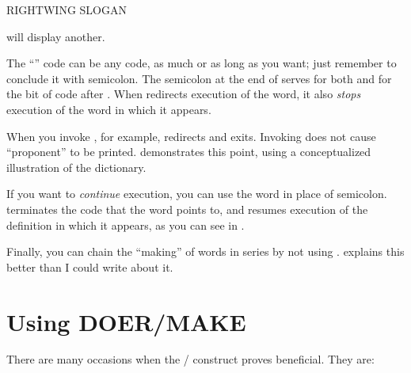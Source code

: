 \begin{Code}
RIGHTWING SLOGAN
\end{Code}
will display another.

The ``'' code can be any \Forth{} code, as much or as long as
you want; just remember to conclude it with semicolon. The semicolon at
the end of  serves for both  and for the
bit of code after . When  redirects execution of
the  word, it also \emph{stops} execution of the word in
which it appears.

When you invoke , for example,  redirects
 and exits. Invoking  does not cause
``proponent'' to be printed.  demonstrates this point, using a
conceptualized illustration of the dictionary.


If you want to \emph{continue} execution, you can use the word
 in place of semicolon.  terminates the code
that the  word points to, and resumes execution of the
definition in which it appears, as you can see in .


Finally, you can chain the ``making'' of  words in series by
not using .  explains this better than I could
write about it.%
%


\section{Using DOER/MAKE}

There are many occasions when the / construct proves
beneficial. They are:


